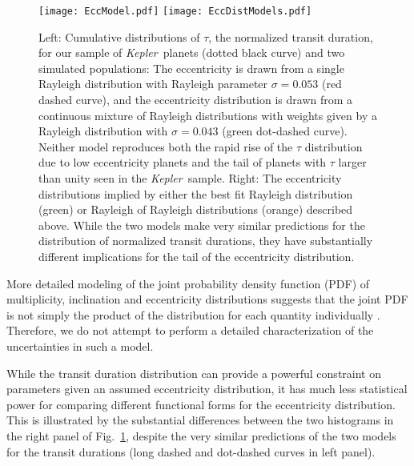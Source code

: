 \documentclass{aastex62}
\newcommand{\ik}{{\it Kepler~}}
\begin{document}
\begin{figure}
    \centering
    \texttt{[image: EccModel.pdf]}
    \texttt{[image: EccDistModels.pdf]}
    \caption{Left:  Cumulative distributions of $\tau$, the normalized transit duration, for our sample of \ik planets (dotted black curve) and two simulated populations: The eccentricity is drawn from a single Rayleigh distribution with Rayleigh parameter $\sigma = 0.053$ (red dashed curve), and the eccentricity distribution is drawn from a continuous mixture of Rayleigh distributions with weights given by a Rayleigh distribution with $\sigma=0.043$ (green dot-dashed curve).  Neither model reproduces both the rapid rise of the $\tau$ distribution due to low eccentricity planets and the tail of planets with $\tau$ larger than unity seen in the \ik sample.  Right:  The eccentricity distributions implied by either the best fit Rayleigh distribution (green) or Rayleigh of Rayleigh distributions (orange) described above.  While the two models make very similar predictions for the distribution of normalized transit durations, they have substantially different implications for the tail of the eccentricity distribution.}
    \label{fig:EccModel}
\end{figure}

More detailed modeling of the joint {probability density function (PDF)} of multiplicity, inclination and eccentricity distributions suggests that the joint {PDF} is not simply the product of the distribution for each quantity individually \citep{He:2019,He:2020,Yang:2020,Millholland:2017}.
Therefore, we do not attempt to perform a detailed characterization of the uncertainties in such a model.

{While the transit duration distribution can provide a powerful constraint on parameters given an assumed eccentricity distribution, it has much less statistical power for comparing different functional forms for the eccentricity distribution.
This is illustrated by the substantial differences between the two histograms in the right panel of Fig.~\ref{fig:EccModel}, despite the very similar predictions of the two models for the transit durations (long dashed and dot-dashed curves in left panel).}
\end{document}
